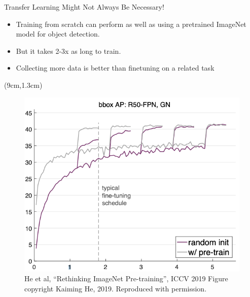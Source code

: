 \documentclass[serif, aspectratio=169]{beamer}
\begin{document}
\begin{frame}{Transfer Learning Might Not Always Be Necessary!}
	\begin{itemize}
		\item Training from scratch can perform as well \newline as using a pretrained ImageNet model for \newline object detection.
		\item But it takes 2-3x as long to train.
		\item Collecting more data is better than \newline finetuning on a related task
	\end{itemize}
	\begin{textblock*}{5cm}(9cm,1.3cm) %
		\begin{figure}
			\includegraphics[keepaspectratio, scale=0.28]{pic/rethinking_imagenet}
			\caption*{\scriptsize He et al, “Rethinking ImageNet Pre-training”, ICCV 2019 Figure copyright Kaiming He, 2019. Reproduced with permission.}
		\end{figure}
	\end{textblock*}
\end{frame}
\end{document}

